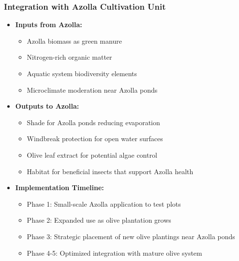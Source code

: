 \subsubsection{Integration with Azolla Cultivation Unit}
\begin{itemize}
    \item \textbf{Inputs from Azolla:}
    \begin{itemize}
        \item Azolla biomass as green manure
        \item Nitrogen-rich organic matter
        \item Aquatic system biodiversity elements
        \item Microclimate moderation near Azolla ponds
    \end{itemize}
    
    \item \textbf{Outputs to Azolla:}
    \begin{itemize}
        \item Shade for Azolla ponds reducing evaporation
        \item Windbreak protection for open water surfaces
        \item Olive leaf extract for potential algae control
        \item Habitat for beneficial insects that support Azolla health
    \end{itemize}
    
    \item \textbf{Implementation Timeline:}
    \begin{itemize}
        \item Phase 1: Small-scale Azolla application to test plots
        \item Phase 2: Expanded use as olive plantation grows
        \item Phase 3: Strategic placement of new olive plantings near Azolla ponds
        \item Phase 4-5: Optimized integration with mature olive system
    \end{itemize}
\end{itemize}

